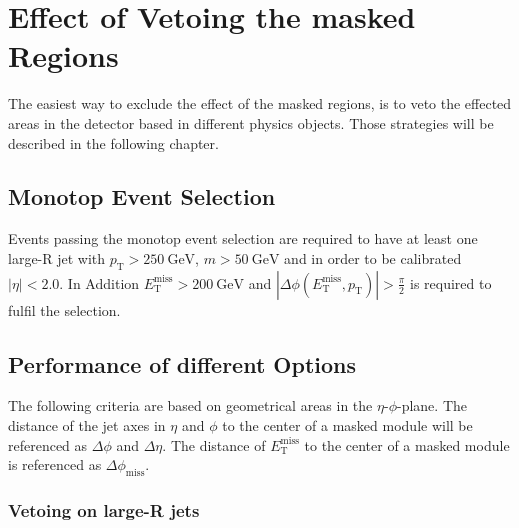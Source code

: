 \chapter{Effect of Vetoing the masked Regions}%

The easiest way to exclude the effect of the masked regions, is to veto the effected areas in the detector based in different physics objects.
Those strategies will be described in the following chapter.

\section{Monotop Event Selection}

Events passing the monotop event selection are required to have at least one large-R jet with $p_{\text{T}} > \SI{250}{\giga\electronvolt}$, $m > \SI{50}{\giga\electronvolt}$ and in order to be calibrated $|\eta| < 2.0$.
In Addition $E_{\mathrm{T}}^{\mathrm{miss}} > \SI{200}{\giga\electronvolt}$ and $|\Delta\phi(E_{\mathrm{T}}^{\mathrm{miss}}, p_{\text{T}})| > \frac{\pi}{2}$ is required to fulfil the selection.

\section{Performance of different Options}

The following criteria are based on geometrical areas in the $\eta$-$\phi$-plane.
The distance of the jet axes in $\eta$ and $\phi$ to the center of a masked module will be referenced as $\Delta\phi$ and $\Delta\eta$.
The distance of $E_{\mathrm{T}}^{\mathrm{miss}}$ to the center of a masked module is referenced as $\Delta\phi_{\mathrm{miss}}$.

\subsection{Vetoing on large-R jets}

